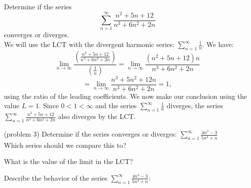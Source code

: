 \documentclass[handout]{ximera}
\begin{document}
\begin{example}[example 3]
Determine if the series 
\[
\sum_{n=1}^\infty \frac{n^2 + 5n + 12}{n^3 + 6n^2 + 2n}
\]
converges or diverges.\\
We will use the LCT with the divergent harmonic series: $\displaystyle{\sum_{n=1}^\infty \frac{1}{n}}$. We have:
\[
\lim_{n \to \infty} \frac{\left(\frac{n^2 + 5n + 12}{n^3 + 6n^2 + 2n}\right)}{\left(\frac{1}{n}\right)} = \lim_{n \to \infty} \frac{(n^2 + 5n + 12)n}{n^3 + 6n^2 + 2n}
\]
\[
= \lim_{n \to \infty} \frac{n^3 + 5n^2 + 12n}{n^3 + 6n^2 + 2n} = 1,
\]
using the ratio of the leading coefficients. We now make our conclusion using the value $L = 1$. Since $0 < 1 < \infty$ and the series $\displaystyle{\sum_{n=1}^\infty \frac{1}{n}}$
diverges, the series $\displaystyle{\sum_{n=1}^\infty \frac{n^2 + 5n + 12}{n^3 + 6n^2 + 2n}}$ also diverges by the LCT.
\end{example}




\begin{problem}(problem 3)
Determine if the series converges or diverges: $\displaystyle{\sum_{n=1}^\infty \frac{4n^3 -3}{5n^4 + n}}$\\
Which series should we compare this to?

\begin{multipleChoice}
\end{multipleChoice}

What is the value of the limit in the LCT?
\begin{multipleChoice}
\end{multipleChoice}

Describe the behavior of the series $\displaystyle{\sum_{n=1}^\infty \frac{4n^3 -3}{5n^4 +n}:}$
\begin{multipleChoice}
\end{multipleChoice}

\end{problem}
\end{document}
